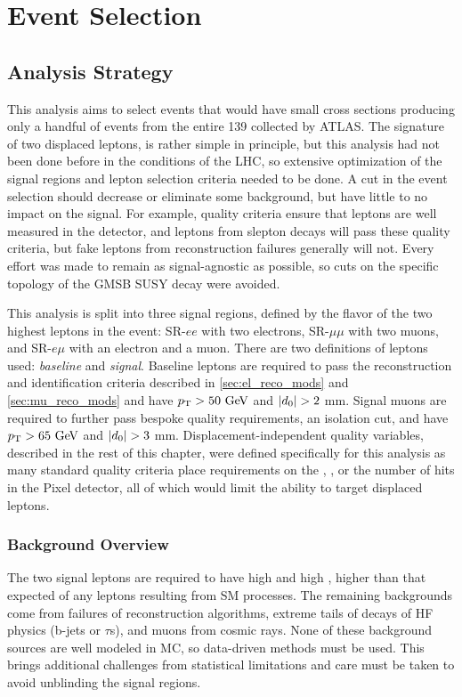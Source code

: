 \chapter{Event Selection}
\label{chap:eventselection}

\section{Analysis Strategy}

This analysis aims to select events that would have small cross sections producing only a handful of events from the entire 139 \ifb collected by \ac{ATLAS}. The signature of two displaced leptons, is rather simple in principle, but this analysis had not been done before in the conditions of the \ac{LHC}, so extensive optimization of the signal regions and lepton selection criteria needed to be done. A cut in the event selection should decrease or eliminate some background, but have little to no impact on the signal. For example, quality criteria ensure that leptons are well measured in the detector, and leptons from slepton decays will pass these quality criteria, but fake leptons from reconstruction failures generally will not. Every effort was made to remain as signal-agnostic as possible, so cuts on the specific topology of the \ac{GMSB} \ac{SUSY} decay were avoided. 

This analysis is split into three signal regions, defined by the flavor of the two highest \pt leptons in the event: SR-$ee$ with two electrons, SR-$\mu\mu$ with two muons, and SR-$e\mu$ with an electron and a muon.
There are two definitions of leptons used: \emph{baseline} and \emph{signal}. Baseline leptons are required to pass the reconstruction and identification criteria described in \autoref{sec:el_reco_mods} and \autoref{sec:mu_reco_mods} and have $\pt > 50 \GeV$ and $|d_0| > 2$ mm. Signal muons are required to further pass bespoke quality requirements, an isolation cut, and have $\pt > 65 \GeV$ and $|d_0| > 3$ mm. Displacement-independent quality variables, described in the rest of this chapter, were defined specifically for this analysis as many standard quality criteria place requirements on the \absdz, \absz, or the number of hits in the Pixel detector, all of which would limit the ability to target displaced leptons.

\subsection{Background Overview}
The two signal leptons are required to have high \pt and high \absdz, higher than that expected of any leptons resulting from \ac{SM} processes. The remaining backgrounds come from failures of reconstruction algorithms, extreme tails of decays of \acf{HF} physics (b-jets or $\tau$s), and muons from cosmic rays. None of these background sources are well modeled in \ac{MC}, so data-driven methods must be used. This brings additional challenges from statistical limitations and care must be taken to avoid unblinding the signal regions.

